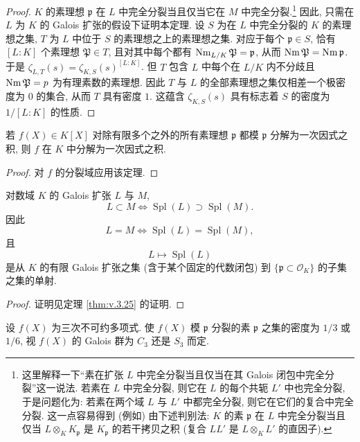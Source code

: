 \begin{proof}
$K$ 的素理想 $\mathfrak{p}$ 在 $L$ 中完全分裂当且仅当它在 $M$ 中完全分裂.\footnote{这里解释一下``素在扩张 $L$ 中完全分裂当且仅当在其 Galois 闭包中完全分裂''这一说法. 若素在 $L$ 中完全分裂, 则它在 $L$ 的每个共轭 $L'$ 中也完全分裂, 于是问题化为: 若素在两个域 $L$ 与 $L'$ 中都完全分裂, 则它在它们的复合中完全分裂. 这一点容易得到 (例如) 由下述判别法: $K$ 的素 $\mathfrak{p}$ 在 $L$ 中完全分裂当且仅当 $L\otimes_{K}K_{\mathfrak{p}}$ 是 $K_{\mathfrak{p}}$ 的若干拷贝之积 (复合 $LL'$ 是 $L\otimes_{K}L'$ 的直因子).} 因此, 只需在 $L$ 为 $K$ 的 Galois 扩张的假设下证明本定理. 设 $S$ 为在 $L$ 中完全分裂的 $K$ 的素理想之集, $T$ 为 $L$ 中位于 $S$ 的素理想之上的素理想之集. 对应于每个 $\mathfrak{p}\in S$, 恰有 $[L:K]$ 个素理想 $\mathfrak{P}\in T$, 且对其中每个都有 $\operatorname{Nm}_{L/K}\mathfrak{P}=\mathfrak{p}$, 从而 $\operatorname{Nm}\mathfrak{P}=\operatorname{Nm}\mathfrak{p}$. 于是 $\zeta_{L,T}(s)=\zeta_{K,S}(s)^{[L:K]}$. 但 $T$ 包含 $L$ 中每个在 $L/K$ 内不分歧且 $\operatorname{Nm}\mathfrak{P}=p$ 为有理素数的素理想. 因此 $T$ 与 $L$ 的全部素理想之集仅相差一个极密度为 $0$ 的集合, 从而 $T$ 具有密度 $1$. 这蕴含 $\zeta_{K,S}(s)$ 具有标志着 $S$ 的密度为 $1/[L:K]$ 的性质.
\end{proof}

\begin{corollary}\label{cor:vi.3.5}
若 $f(X)\in K[X]$ 对除有限多个之外的所有素理想 $\mathfrak{p}$ 都模 $\mathfrak{p}$ 分解为一次因式之积, 则 $f$ 在 $K$ 中分解为一次因式之积.
\end{corollary}

\begin{proof}
对 $f$ 的分裂域应用该定理.
\end{proof}

\begin{corollary}[Bauer 1916]\label{cor:vi.3.6}
对数域 $K$ 的 Galois 扩张 $L$ 与 $M$,
\[
L\subset M\iff\operatorname{Spl}(L)\supset\operatorname{Spl}(M).
\]
因此
\[
L=M\iff\operatorname{Spl}(L)=\operatorname{Spl}(M),
\]
且
\[
L\mapsto\operatorname{Spl}(L)
\]
是从 $K$ 的有限 Galois 扩张之集 (含于某个固定的代数闭包) 到 $\{\mathfrak{p}\subset\mathcal{O}_K\}$ 的子集之集的单射.
\end{corollary}

\begin{proof}
证明见定理 \ref{thm:v.3.25} 的证明.
\end{proof}

\begin{example}\label{ex:vi.3.7}
设 $f(X)$ 为三次不可约多项式. 使 $f(X)$ 模 $\mathfrak{p}$ 分裂的素 $\mathfrak{p}$ 之集的密度为 $1/3$ 或 $1/6$, 视 $f(X)$ 的 Galois 群为 $C_3$ 还是 $S_3$ 而定.
\end{example}

